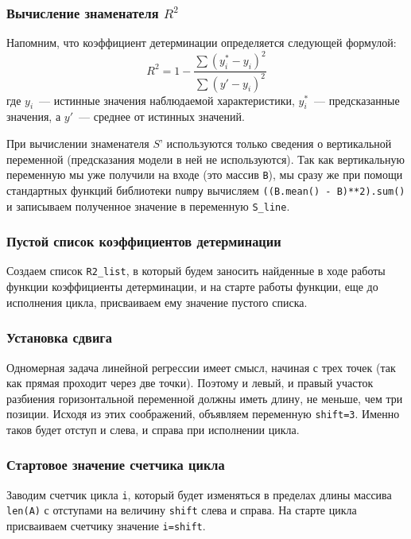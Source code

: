\documentclass[a4paper,12pt]{article}
\begin{document}
\subsubsection{Вычисление знаменателя $R^2$}


Напомним, что коэффициент детерминации определяется следующей формулой:
$$
R^2 = 1 - \frac{\displaystyle\sum (y^*_i - y_i)^2}
{\displaystyle\sum (y' - y_i)^2}
$$
где $y_i$~--- истинные значения наблюдаемой характеристики, $y^*_i$~--- предсказанные значения, а $y'$~--- среднее от истинных значений.

При вычислении знаменателя $S’$ используются только сведения о вертикальной переменной (предсказания модели в ней не используются). Так как вертикальную переменную мы уже получили на входе (это массив \texttt{B}), мы сразу же при помощи стандартных функций библиотеки \texttt{numpy} вычисляем \texttt{((B.mean() - B)**2).sum()} и записываем полученное значение в переменную \texttt{S\_line}.


\subsubsection{Пустой список коэффициентов детерминации} 

Создаем список \texttt{R2\_list}, в который будем заносить найденные в ходе работы функции коэффициенты детерминации, и на старте работы функции, еще до исполнения цикла, присваиваем ему значение пустого списка.

\subsubsection{Установка сдвига}

Одномерная задача линейной регрессии имеет смысл, начиная с трех точек (так как прямая проходит через две точки). Поэтому и левый, и правый участок разбиения горизонтальной переменной должны иметь длину, не меньше, чем три позиции. Исходя из этих соображений, объявляем переменную \texttt{shift=3}. Именно таков будет отступ и слева, и справа при исполнении цикла.

\subsubsection{Стартовое значение счетчика цикла} 

Заводим счетчик цикла \texttt{i}, который будет изменяться в пределах длины массива \texttt{len(A)} с отступами на величину \texttt{shift} слева и справа. На старте цикла присваиваем счетчику значение \texttt{i=shift}.
\end{document}
